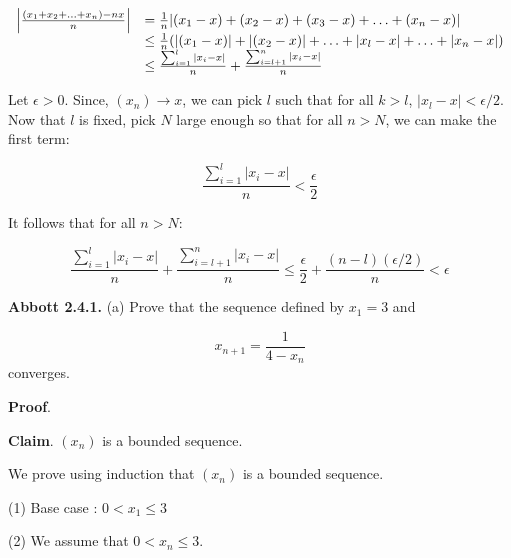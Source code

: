 \documentclass[10pt]{article}
\begin{document}
\begin{equation*}
\begin{array}{ c l }
\left| \frac{( x_{1} +x_{2} +\dotsc +x_{n}) -nx}{n}\right|  & =\frac{1}{n} |( x_{1} -x) +( x_{2} -x) +( x_{3} -x) +\dotsc +( x_{n} -x) |\\
 & \leq \frac{1}{n}( |( x_{1} -x) |+|( x_{2} -x) |+\dotsc +|x_{l} -x|+\dotsc +|x_{n} -x|)\\
 & \leq \frac{\sum _{i=1}^{l} |x_{i} -x|}{n} +\frac{\sum _{i=l+1}^{n} |x_{i} -x|}{n}
\end{array}
\end{equation*}


Let $\displaystyle \epsilon  >0$. Since, $\displaystyle ( x_{n})\rightarrow x$, we can pick $\displaystyle l$ such that for all $\displaystyle k >l$, $\displaystyle |x_{l} -x|< \epsilon /2$. Now that $\displaystyle l$ is fixed, pick $\displaystyle N$ large enough so that for all $\displaystyle n >N$, we can make the first term:


\begin{equation*}
\frac{\sum _{i=1}^{l} |x_{i} -x|}{n} < \frac{\epsilon }{2}
\end{equation*}


It follows that for all $\displaystyle n >N$:


\begin{equation*}
\frac{\sum _{i=1}^{l} |x_{i} -x|}{n} +\frac{\sum _{i=l+1}^{n} |x_{i} -x|}{n} \leq \frac{\epsilon }{2} +\frac{( n-l)( \epsilon /2)}{n} < \epsilon 
\end{equation*}


\textbf{Abbott 2.4.1.} (a) Prove that the sequence defined by $\displaystyle x_{1} =3$ and 


\begin{equation*}
x_{n+1} =\frac{1}{4-x_{n}}
\end{equation*}
converges.



\textbf{Proof}.



\textbf{Claim}. $\displaystyle ( x_{n})$ is a bounded sequence.



We prove using induction that $\displaystyle ( x_{n})$ is a bounded sequence.



(1) Base case : $\displaystyle 0< x_{1} \leq 3$

(2) We assume that $\displaystyle 0< x_{n} \leq 3$.
\end{document}
